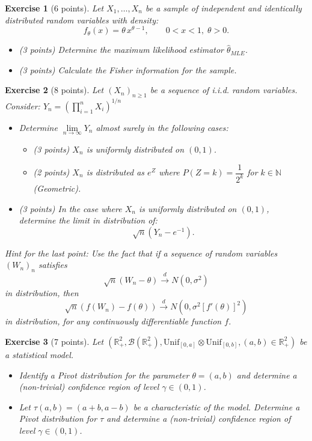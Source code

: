 \documentclass[12pt]{article}
\newcommand{\nameEjercicio}{Exercise}
\newtheorem{ejercicio}{\nameEjercicio} [section]     %
\begin{document}
    \begin{ejercicio}[6 points]
        Let $X_1, \dots, X_n$ be a sample of independent and identically distributed random variables with density:
        \[
        f_\theta(x) = \theta \, x^{\theta-1}, \qquad 0 < x < 1, \; \theta > 0.
        \]
        \begin{itemize}
            \item (3 points) Determine the maximum likelihood estimator $\hat{\theta}_{MLE}$.
            \item (3 points) Calculate the Fisher information for the sample.
        \end{itemize}
    \end{ejercicio}

    \begin{ejercicio}[8 points]
        Let $(X_n)_{n \ge 1}$ be a sequence of i.i.d. random variables. Consider: $Y_n = \left(\prod\limits_{i=1}^n X_i \right)^{1/n}$
        \begin{itemize}
            \item Determine $\lim\limits_{n \to \infty} Y_n$ almost surely in the following cases:
            \begin{itemize}
                \item (3 points) $X_n$ is uniformly distributed on $(0,1)$.
                \item (2 points) $X_n$ is distributed as $e^Z$ where $P(Z = k) = \dfrac{1}{2^k}$ for $k \in \mathbb{N}$ (Geometric).
            \end{itemize}
            \item (3 points) In the case where $X_n$ is uniformly distributed on $(0,1)$, determine the limit in distribution of:
            \[
            \sqrt{n}(Y_n - e^{-1}).
            \]
        \end{itemize}
        \textit{\small Hint for the last point: Use the fact that if a sequence of random variables $(W_n)_n$ satisfies $$\sqrt{n}(W_n - \theta) \xrightarrow{d} N(0, \sigma^2)$$ in distribution, then $$\sqrt{n}(f(W_n) - f(\theta)) \xrightarrow{d} N(0, \sigma^2 [f'(\theta)]^2)$$ in distribution, for any continuously differentiable function $f$.}
    \end{ejercicio}

    \begin{ejercicio}[7 points]
        Let $(\mathbb{R}_+^2, \mathcal{B}(\mathbb{R}_+^2), \text{Unif}_{[0,a]} \otimes \text{Unif}_{[0,b]}, (a,b) \in \mathbb{R}_+^2)$ be a statistical model.
        \begin{itemize}
            \item Identify a Pivot distribution for the parameter $\theta = (a,b)$ and determine a (non-trivial) confidence region of level $\gamma \in (0,1)$.
            \item Let $\tau(a,b) = (a+b, a-b)$ be a characteristic of the model. Determine a Pivot distribution for $\tau$ and determine a (non-trivial) confidence region of level $\gamma \in (0,1)$.
        \end{itemize}
    \end{ejercicio}
\end{document}
